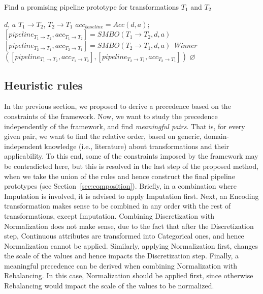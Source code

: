 \begin{algorithm*}[!h]
	\caption{Find a promising pipeline prototype for transformations $T_1$ and $T_2$}
	\label{alg:learned-rules}
	\begin{algorithmic}[1]
		\Require $d$, $a$ 
		\Require \indent$T_1\rightarrow T_2$, $T_2 \rightarrow T_1$ 
		\State $acc_{baseline} = Acc(d,a)$; 
		\State $[pipeline_{T_1\rightarrow T_2},acc_{T_1\rightarrow T_2}] = SMBO(T_1\rightarrow T_2,d, a)$
		\State $[pipeline_{T_2\rightarrow T_1},acc_{T_2\rightarrow T_1}] = SMBO(T_2\rightarrow T_1,d, a)$
        \State \Return \textit{Winner}$([pipeline_{T_1\rightarrow T_2},acc_{T_1\rightarrow T_2}],[pipeline_{T_2\rightarrow T_1},acc_{T_2\rightarrow T_1}])$ 
		\Else
		\State \Return $\varnothing$
		\EndIf
	\end{algorithmic}
\end{algorithm*}

\subsection{Heuristic rules}
\label{sec:rules-heuristics}
In the previous section, we proposed to derive a precedence based on the constraints of the framework. Now, we want to study the precedence independently of the framework, and find \textit{meaningful pairs}. That is, for every given pair, we want to find the relative order, based on generic, domain-independent knowledge (i.e., literature) about transformations and their applicability. To this end, some of the constraints imposed by the framework may be contradicted here, but this is resolved in the last step of the proposed method, when we take the union of the rules and hence construct the final pipeline prototypes (see Section~\ref{sec:composition}). Briefly, in a combination where Imputation is involved, it is advised to apply Imputation first. Next, an Encoding transformation makes sense to be combined in any order with the rest of transformations, except Imputation. 
Combining Discretization with Normalization does not make sense, due to the fact that after the Discretization step, Continuous attributes are transformed into Categorical ones, and hence Normalization cannot be applied. Similarly, applying Normalization first, changes the scale of the values and hence impacts the Discretization step. Finally, a meaningful precedence can be derived when combining Normalization with Rebalancing. In this case, Normalization should be applied first, since otherwise Rebalancing would impact the scale of the values to be normalized.


